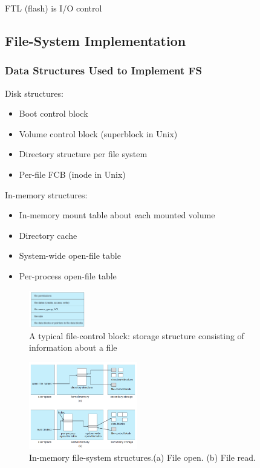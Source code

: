 FTL (flash) is I/O control

\subsection{File-System Implementation}
\subsubsection{Data Structures Used to Implement FS}
Disk structures:
\begin{itemize}
    \item Boot control block
    \item Volume control block (superblock in Unix)
    \item Directory structure per file system
    \item Per-file FCB (inode in Unix)
\end{itemize}
In-memory structures:
\begin{itemize}
    \item In-memory mount table about each mounted volume
    \item Directory cache
    \item System-wide open-file table
    \item Per-process open-file table
\end{itemize}

\begin{figure}[!htb]
    \centering
    \includegraphics[width=0.22\textwidth]{pic/OS11/A typical file-control block}
    \caption{A typical file-control block: storage structure consisting of information about a file}
\end{figure}

\begin{figure}[!htb]
    \centering
    \includegraphics[width=0.42\textwidth]{pic/OS11/In-memory file-system structures.}
    \caption{In-memory file-system structures.(a) File open. (b) File read.}
\end{figure}

